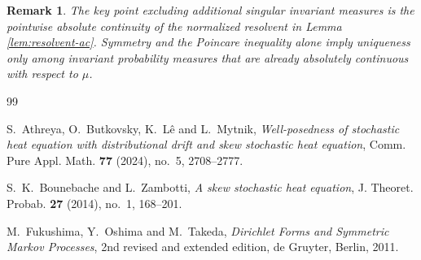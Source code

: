 \documentclass[11pt]{article}
\numberwithin{equation}{section}
\newtheorem{remark}[theorem]{Remark}
\newcommand{\1}{\mathbf 1}
\begin{document}
\begin{remark}
The key point excluding additional singular invariant measures is the pointwise
absolute continuity of the normalized resolvent in Lemma \ref{lem:resolvent-ac}.
Symmetry and the Poincare inequality alone imply uniqueness only among invariant
probability measures that are already absolutely continuous with respect to $\mu$.
\end{remark}

\begin{thebibliography}{99}

S.~Athreya, O.~Butkovsky, K.~L\^e and L.~Mytnik,
\emph{Well-posedness of stochastic heat equation with distributional drift and skew stochastic heat equation},
Comm. Pure Appl. Math. \textbf{77} (2024), no.~5, 2708--2777.

S.~K.~Bounebache and L.~Zambotti,
\emph{A skew stochastic heat equation},
J. Theoret. Probab. \textbf{27} (2014), no.~1, 168--201.

M.~Fukushima, Y.~Oshima and M.~Takeda,
\emph{Dirichlet Forms and Symmetric Markov Processes},
2nd revised and extended edition, de Gruyter, Berlin, 2011.

\end{thebibliography}
\end{document}
